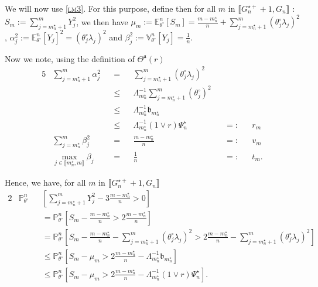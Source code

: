 We will now use \textsc{\cref{lm3}}. For this purpose, define then for all $m$ in $\llbracket G_{n}^{\star+} + 1, G_{n} \rrbracket$ : $S_{m} := \sum\limits_{j = m_{n}^{\star} + 1}^{m} Y_{j}^{2}$, we then have $\mu_{m} := \mathds{E}_{\theta^{\circ}}^{n}\left[S_{m}\right] = \frac{m- m_{n}^{\star}}{n} + \sum\limits_{j = m_{n}^{\star} + 1}^{m} \left(\theta^{\circ}_{j}\lambda_{j}\right)^{2}$, $\alpha_{j}^{2} := \mathds{E}_{\theta^{\circ}}^{n}\left[Y_{j}\right]^{2} =  \left(\theta^{\circ}_{j}\lambda_{j}\right)^{2}$ and $\beta_{j}^{2} := \mathds{V}_{\theta^{\circ}}^{n}\left[Y_{j}\right] = \frac{1}{n}$.

Now we note, using the definition of $\Theta^{\mathfrak{a}}(r)$
\begin{alignat*}{5}
& \sum\limits_{j = m_{n}^{\star} + 1}^{m} \alpha_{j}^{2} && = && \sum\limits_{j = m_{n}^{\star} + 1}^{m}\left(\theta^{\circ}_{j}\lambda_{j}\right)^{2}&& && \\
& && \leq && \Lambda_{m_{n}^{\star}}^{-1} \sum\limits_{j = m_{n}^{\star} + 1}^{m}\left(\theta^{\circ}_{j}\right)^{2} && && \\
& && \leq && \Lambda_{m_{n}^{\star}}^{-1} \mathfrak{b}_{m_{n}^{\star}} && &&\\
& && \leq && \Lambda_{m_{n}^{\star}}^{-1} \left( 1 \vee r\right) \Psi_{n}^{\star} && =: && r_{m}\\
& \sum\limits_{j = m_{n}^{\star}}^{m} \beta_{j}^{2} && = && \frac{m - m_{n}^{\star}}{n} && =: && v_{m}\\
& \max\limits_{j \in \llbracket m_{n}^{\star}, m \rrbracket} \beta_{j} && = && \frac{1}{n} && =: && t_{m}.
\end{alignat*}

Hence, we have, for all $m$ in $\llbracket G_{n}^{\star+} + 1, G_{n}\rrbracket$
\begin{alignat*}{2}
& \mathds{P}_{\theta^{\circ}}^{n}&&\left[\sum\limits_{j = m_{n}^{\star} + 1}^{m} Y_{j}^{2} - 3 \frac{m - m_{n}^{\star}}{n} > 0\right]\\
& && = \mathds{P}_{\theta^{\circ}}^{n}\left[S_{m} - \frac{m - m_{n}^{\star}}{n} > 2 \frac{m - m_{n}^{\star}}{n}\right]\\
& && = \mathds{P}_{\theta^{\circ}}^{n}\left[S_{m} - \frac{m - m_{n}^{\star}}{n} - \sum\limits_{j = m_{n}^{\star} + 1}^{m} \left(\theta^{\circ}_{j}\lambda_{j}\right)^{2} > 2 \frac{m - m_{n}^{\star}}{n} - \sum\limits_{j = m_{n}^{\star} + 1}^{m} \left(\theta^{\circ}_{j}\lambda_{j}\right)^{2}\right]\\
& && \leq \mathds{P}_{\theta^{\circ}}^{n}\left[S_{m} - \mu_{m} > 2 \frac{m - m_{n}^{\star}}{n} - \Lambda_{m_{n}^{\star}}^{-1} \mathfrak{b}_{m_{n}^{\star}}\right]\\
& && \leq \mathds{P}_{\theta^{\circ}}^{n}\left[S_{m} - \mu_{m} > 2 \frac{m - m_{n}^{\star}}{n} - \Lambda_{m_{n}^{\star}}^{-1} \left(1 \vee r\right) \Psi_{n}^{\star} \right].
\end{alignat*}

